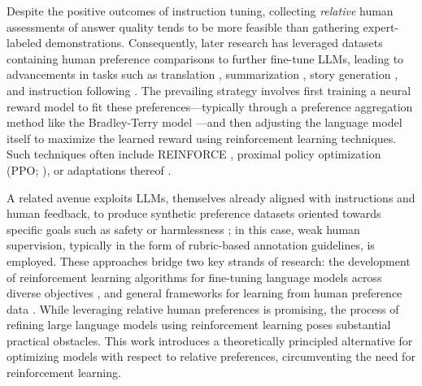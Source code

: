 Despite the positive outcomes of instruction tuning, collecting \textit{relative} human assessments of answer quality tends to be more feasible than gathering expert-labeled demonstrations. Consequently, later research has leveraged datasets containing human preference comparisons to further fine-tune LLMs, leading to advancements in tasks such as translation \citep{kreutzer-etal-2018-reliability}, summarization \citep{stiennon2022learning,ziegler2020finetuning}, story generation \citep{ziegler2020finetuning}, and instruction following \citep{ouyang2022training,ramamurthy2023is}. The prevailing strategy involves first training a neural reward model to fit these preferences—typically through a preference aggregation method like the Bradley-Terry model \citep{bradley1952rankanalysis}—and then adjusting the language model itself to maximize the learned reward using reinforcement learning techniques. Such techniques often include REINFORCE \citep{williams1992reinforce}, proximal policy optimization (PPO; \cite{schulman2017proximal}), or adaptations thereof \citep{ramamurthy2023is}. 

A related avenue exploits LLMs, themselves already aligned with instructions and human feedback, to produce synthetic preference datasets oriented towards specific goals such as safety or harmlessness \citep{bai2022constitutional}; in this case, weak human supervision, typically in the form of rubric-based annotation guidelines, is employed. These approaches bridge two key strands of research: the development of reinforcement learning algorithms for fine-tuning language models across diverse objectives \citep{Ranzato2015SequenceLT,paulus2018a,wu2018learning}, and general frameworks for learning from human preference data \citep{christiano2017deep,kupcsik2018learning}. While leveraging relative human preferences is promising, the process of refining large language models using reinforcement learning poses substantial practical obstacles. This work introduces a theoretically principled alternative for optimizing models with respect to relative preferences, circumventing the need for reinforcement learning.

